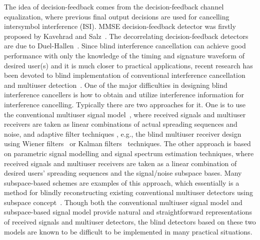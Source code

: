 \documentclass[a4paper,10pt,fleqn, twocolumn]{IEEETran}
\begin{document}
The idea of decision-feedback comes from the decision-feedback channel
equalization, where previous final output decisions are used for cancelling intersymbol interference (ISI).
MMSE decision-feedback detector was firstly proposed by Kavehrad and Salz~\cite{Kave85}. The decorrelating decision-feedback detectors are due to Duel-Hallen~\cite{Duel93,Duel95}. Since blind
interference cancellation can achieve good performance with only
the knowledge of the timing and signature waveform of desired
user(s) and it is much closer to practical applications, recent research has been devoted to blind implementation of conventional interference
cancellation and multiuser detection~\cite{Madh94,Honi95,Torl97,Wang98,Wang99,Zhang02}. One of the major difficulties in designing blind interference
cancellers is how to obtain and utilize interference information for interference cancelling. Typically there are two approaches for it. One is to use the conventional multiuser signal
model~\cite{Verd98}, where received signals and multiuser
receivers are taken as linear combinations of actual spreading
sequences and noise, and adaptive filter techniques , e.g., the blind multiuser receiver
design using Wiener filters~\cite{Madh94,Honi95} or Kalman
filters~\cite{Zhang02} techniques. The other approach is based on
parametric signal modelling and signal spectrum estimation techniques, where
received signals and multiuser receivers are taken as a linear
combination of desired users' spreading sequences and the
signal/noise subspace bases. Many subspace-based schemes are
examples of this approach, which essentially is a method for
blindly reconstructing existing conventional multiuser detectors
using subspace concept~\cite{Wang98,Wang99}. Though both the
conventional multiuser signal model and subspace-based signal
model provide natural and straightforward representations of
received signals and multiuser detectors, the blind detectors
based on these two models are known to be difficult to be implemented in many practical situations.
\end{document}
